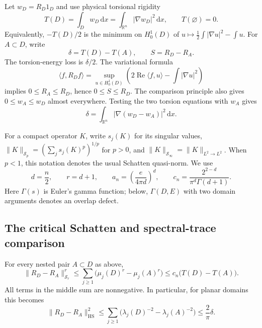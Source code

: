 \documentclass[11pt,reqno]{amsart}
\numberwithin{equation}{section}
\newcommand{\R}{\mathbb R}
\newcommand{\dd}{\,\mathrm d}
\newcommand{\abs}[1]{\lvert#1\rvert}
\newcommand{\norm}[1]{\lVert#1\rVert}
\begin{document}
Let $w_D=R_D1_D$ and use physical torsional rigidity
\begin{equation}\label{op:torsion}
 T(D)=\int_D w_D\dd x
     =\int_{\R^n}\abs{\nabla w_D}^2\dd x,
 \qquad T(\varnothing)=0.
\end{equation}
Equivalently, $-T(D)/2$ is the minimum on $H_0^1(D)$ of
$u\mapsto\frac12\int\abs{\nabla u}^2-\int u$.
For $A\subset D$, write
\begin{equation}\label{op:loss}
 \delta=T(D)-T(A),\qquad S=R_D-R_A.
\end{equation}
The torsion-energy loss is $\delta/2$.  The variational formula
\begin{equation}\label{op:inverse-order}
 \langle f,R_Df\rangle
 =\sup_{u\in H_0^1(D)}
   \left(2\operatorname{Re}\langle f,u\rangle
          -\int\abs{\nabla u}^2\right)
\end{equation}
implies $0\le R_A\le R_D$, hence $0\le S\le R_D$.
The comparison principle also gives $0\le w_A\le w_D$ almost
everywhere.  Testing the two torsion equations with $w_A$ gives
\begin{equation}\label{op:torsion-energy-identity}
 \delta=\int_{\R^n}\abs{\nabla(w_D-w_A)}^2\dd x.
\end{equation}

For a compact operator $K$, write $s_j(K)$ for its singular values,
$\norm K_{\mathcal S_p}=(\sum_j s_j(K)^p)^{1/p}$ for $p>0$,
and $\norm K_{\mathcal S_\infty}=\norm K_{L^2\to L^2}$.
When $p<1$, this notation denotes the usual Schatten quasi-norm.
We use
\begin{equation}\label{op:constants}
 d=\frac n2,\qquad r=d+1,\qquad
 a_n=\left(\frac{e}{4\pi d}\right)^d,\qquad
 c_n=\frac{2^{2-d}}{\pi^d\Gamma(d+1)}.
\end{equation}
Here $\Gamma(s)$ is Euler's gamma function; below,
$\Gamma(D,E)$ with two domain arguments denotes an overlap defect.

\subsection{The critical Schatten and spectral-trace comparison}
\label{op:critical}

For every nested pair $A\subset D$ as above,
\begin{equation}\label{op:critical-bound}
 \boxed{\quad
 \norm{R_D-R_A}_{\mathcal S_r}^{r}
 \le \sum_{j\ge1}\bigl(\mu_j(D)^r-\mu_j(A)^r\bigr)
 \le c_n\bigl(T(D)-T(A)\bigr).
 \quad}
\end{equation}
All terms in the middle sum are nonnegative.  In particular, for
planar domains this becomes
\begin{equation}\label{op:planar-critical}
 \norm{R_D-R_A}_{\mathrm{HS}}^2
 \le\sum_{j\ge1}\bigl(\lambda_j(D)^{-2}-\lambda_j(A)^{-2}\bigr)
 \le\frac2\pi\delta.
\end{equation}
\end{document}

